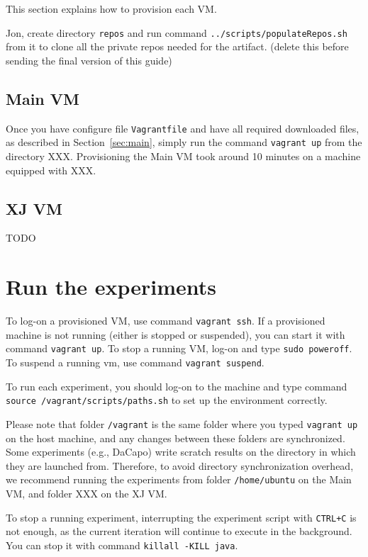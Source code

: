 \documentclass[12pt]{article}
\begin{document}
This section explains how to provision each VM.

Jon, create directory \texttt{repos} and run command
\texttt{../scripts/populateRepos.sh} from it to clone all the private repos
needed for the artifact. (delete this before sending the final version of this
guide)

\subsection{Main VM}

Once you have configure file \texttt{Vagrantfile} and have all required
downloaded files, as described in Section~\ref{sec:main}, simply run the command
\texttt{vagrant up} from the directory XXX.  Provisioning the Main VM took around 10
minutes on a machine equipped with XXX.

\subsection{XJ VM}

TODO

\section{Run the experiments}

To log-on a provisioned VM, use command \texttt{vagrant ssh}.  If a provisioned
machine is not running (either is stopped or suspended), you can start it with
command \texttt{vagrant up}.  To stop a running VM, log-on and type \texttt{sudo
poweroff}.  To suspend a running vm, use command \texttt{vagrant suspend}.

To run each experiment, you should log-on to the machine and type command
\texttt{source /vagrant/scripts/paths.sh} to set up the environment correctly.

Please note that folder \texttt{/vagrant} is the same folder where you typed
\texttt{vagrant up} on the host machine, and any changes between these folders
are synchronized.  Some experiments (e.g., DaCapo) write scratch results on the
directory in which they are launched from.  Therefore, to avoid directory
synchronization overhead, we recommend running the experiments from folder
\texttt{/home/ubuntu} on the Main VM, and folder XXX on the XJ VM.

To stop a running experiment, interrupting the experiment script with
\texttt{CTRL+C} is not enough, as the current iteration will continue to execute
in the background.  You can stop it with command \texttt{killall -KILL java}.
\end{document}

